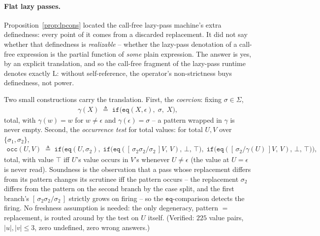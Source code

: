 
\paragraph{Flat lazy passes.}
Proposition~\ref{prop:lpcons} located the call-free lazy-pass machine's
extra definedness: every point of it comes from a discarded replacement.
It did not say whether that definedness is \emph{realizable} -- whether
the lazy-pass denotation of a call-free expression is the partial
function of \emph{some} plain expression.  The answer is yes, by an
explicit translation, and so the call-free fragment of the lazy-pass
runtime denotes exactly $\mathrm{L}$: without self-reference, the
operator's non-strictness buys definedness, not power.

Two small constructions carry the translation.  First, the
\emph{coercion}: fixing $\sigma \in \Sigma$,
\begin{align*}
  \gamma(X) \;\triangleq\; \mathtt{if}\big(\mathtt{eq}(X,\epsilon),\;
  \sigma,\; X\big),
\end{align*}
total, with $\gamma(w) = w$ for $w \neq \epsilon$ and
$\gamma(\epsilon) = \sigma$ -- a pattern wrapped in $\gamma$ is never
empty.  Second, the \emph{occurrence test} for total values: for total
$U, V$ over $\{\sigma_1, \sigma_2\}$,
\begin{align*}
  \mathtt{occ}(U,V) \;\triangleq\;
  \mathtt{if}\Big(\mathtt{eq}(U,\sigma_2),\;
    \mathtt{if}\big(\mathtt{eq}([\,\sigma_2\sigma_2/\sigma_2\,]V,\,V),\,
      \bot,\,\top\big),\;
    \mathtt{if}\big(\mathtt{eq}([\,\sigma_2/\gamma(U)\,]V,\,V),\,
      \bot,\,\top\big)\Big),
\end{align*}
total, with value $\top$ iff $U$'s value occurs in $V$'s whenever
$U \neq \epsilon$ (the value at $U = \epsilon$ is never read).  Soundness
is the observation that a pass whose replacement differs from its
pattern changes its scrutinee iff the pattern occurs -- the replacement
$\sigma_2$ differs from the pattern on the second branch by the case
split, and the first branch's $[\,\sigma_2\sigma_2/\sigma_2\,]$ strictly
grows on firing -- so the $\mathtt{eq}$-comparison detects the firing.
No freshness assumption is needed: the only degeneracy, pattern $=
$ replacement, is routed around by the test on $U$ itself.
(Verified: $225$ value pairs, $|u|, |v| \leq 3$, zero undefined, zero
wrong answers.)

